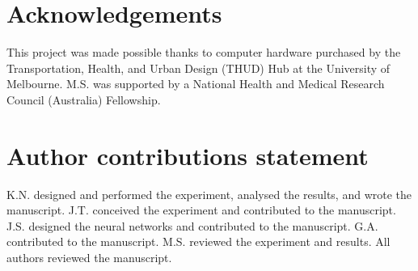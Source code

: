 \documentclass[Crown,sageh,times]{sagej}
\begin{document}
\maketitle

\section{Acknowledgements}
This project was made possible thanks to computer hardware purchased by the Transportation, Health, and Urban Design (THUD) Hub at the University of Melbourne. M.S. was supported by a National Health and Medical Research Council (Australia) Fellowship.
\section{Author contributions statement}

K.N. designed and performed the experiment, analysed the results, and wrote the manuscript. J.T. conceived the experiment and contributed to the manuscript. J.S. designed the neural networks and contributed to the manuscript. G.A. contributed to the manuscript. M.S. reviewed the experiment and results. All authors reviewed the manuscript. 
\end{document}
